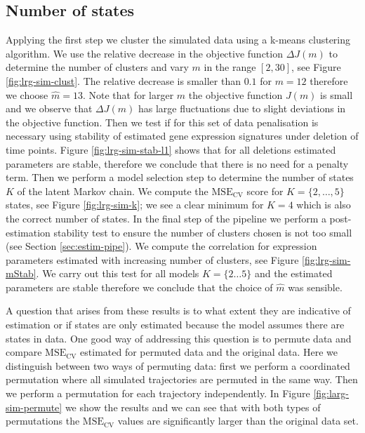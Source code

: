 \subsection{Number of states}
\label{sec:number-states-res}

Applying the first step we cluster the simulated data using a k-means clustering algorithm. We use the relative decrease in the objective function $\Delta J(m)$ to determine the number of clusters and vary $m$ in the range $[2, 30]$, see Figure \ref{fig:lrg-sim-clust}. The relative decrease is smaller than $0.1$ for $m=12$ therefore we choose $\hat{m} = 13$. Note that for larger $m$ the objective function $J(m)$ is small and we observe that $\Delta J(m)$ has large fluctuations due to slight deviations in the objective function. Then we test if for this set of data penalisation is necessary using stability of estimated gene expression signatures under deletion of time points. Figure \ref{fig:lrg-sim-stab-l1} shows that for all deletions estimated parameters are stable, therefore we conclude that there is no need for a penalty term. Then we perform a model selection step to determine the number of states $K$ of the latent Markov chain. We compute the $\mathrm{MSE_{CV}}$ score for $K=\lbrace 2, \ldots, 5 \rbrace$ states, see Figure \ref{fig:lrg-sim-k}; we see a clear minimum for $K=4$ which is also the correct number of states. In the final step of the pipeline we perform a post-estimation stability test to ensure the number of clusters chosen is not too small (see Section \ref{sec:estim-pipe}). We compute the correlation for expression parameters estimated with increasing number of clusters, see Figure \ref{fig:lrg-sim-mStab}. We carry out this test for all models $K = \lbrace 2 \ldots 5\rbrace $ and the estimated parameters are stable therefore we conclude that the choice of $\hat{m}$ was sensible. 

A question that arises from these results is to what extent they are indicative of estimation or if states are only estimated because the model assumes there are states in data. One good way of addressing this question is to permute data and compare  $\mathrm{MSE_{CV}}$ estimated for permuted data and the original data. Here we distinguish between two ways of permuting data: first we perform a coordinated permutation where all simulated trajectories are permuted in the same way. Then we perform a permutation for each trajectory independently. In Figure \ref{fig:larg-sim-permute} we show the results and we can see that with both types of permutations the $\mathrm{MSE_{CV}}$ values are significantly larger than the original data set.

